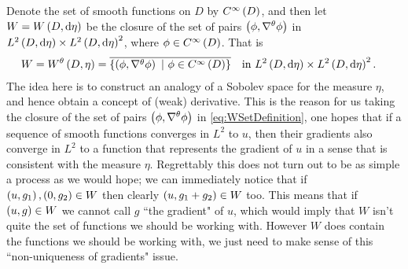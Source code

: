 Denote the set of smooth functions on $D$ by $C^{\infty}\left( D \right)$, and then let $W=W\left( D,\mathrm{d}\eta \right)$ be the closure of the set of pairs $\left( \phi,\nabla^{\theta}\phi \right)$ in $L^{2}\left( D,\mathrm{d}\eta \right)\times L^{2}\left( D,\mathrm{d}\eta \right)^2$, where $\phi\in C^{\infty}\left( D \right)$.
That is
\begin{align} \label{eq:WSetDefinition}
	W = W^{\theta}\left( D,\eta \right) &= \overline{\left\{ \left( \phi,\nabla^{\theta}\phi \right) \ \vert \ \phi\in C^{\infty}\left( D \right) \right\}} \quad \text{in} \ L^{2}\left( D,\mathrm{d}\eta \right)\times L^{2}\left( D,\mathrm{d}\eta \right)^2.
\end{align}
The idea here is to construct an analogy of a Sobolev space for the measure $\eta$, and hence obtain a concept of (weak) derivative.
This is the reason for us taking the closure of the set of pairs $\left( \phi, \nabla^{\theta}\phi \right)$ in \eqref{eq:WSetDefinition}, one hopes that if a sequence of smooth functions converges in $L^2$ to $u$, then their gradients also converge in $L^2$ to a function that represents the gradient of $u$ in a sense that is consistent with the measure $\eta$.
Regrettably this does not turn out to be as simple a process as we would hope; we can immediately notice that if $\left( u,g_1 \right),\left( 0,g_2 \right)\in W$ then clearly $\left( u, g_1+g_2 \right)\in W$ too.
This means that if $\left( u,g \right)\in W$ we cannot call $g$ ``the gradient" of $u$, which would imply that $W$ isn't quite the set of functions we should be working with.
However $W$ does contain the functions we should be working with, we just need to make sense of this ``non-uniqueness of gradients" issue. \newline


